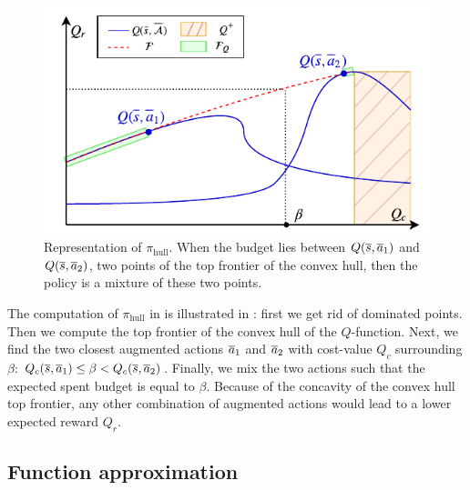 \documentclass{article}
\begin{document}
\begin{figure}
\vspace{-15pt}
    \centering
    \includegraphics[width=1.0\linewidth]{source/img/pi.pdf}
    \caption{Representation of $\pi_\text{hull}$. When the budget lies between $Q(\overline{s},\overline{a}_1)$ and $Q(\overline{s},\overline{a}_2)$, two points of the top frontier of the convex hull, then the policy is a mixture of these two points.}
    \label{fig:hull}
\vspace{-30pt}
\end{figure}

The computation of $\pi_\text{hull}$ in  is illustrated in : first we get rid of dominated points. Then we compute the top frontier of the convex hull of the $Q$-function. Next, we find the two closest augmented actions $\overline{a}_1$ and $\overline{a}_2$ with cost-value $Q_c$ surrounding $\beta$:  $Q_c(\overline{s},\overline{a}_1)\leq\beta<Q_c(\overline{s},\overline{a}_2)$. Finally, we mix the two actions such that the expected spent budget is equal to $\beta$. Because of the concavity of the convex hull top frontier, any other combination of augmented actions would lead to a lower expected reward $Q_r$. 




\subsection{Function approximation}
\end{document}
